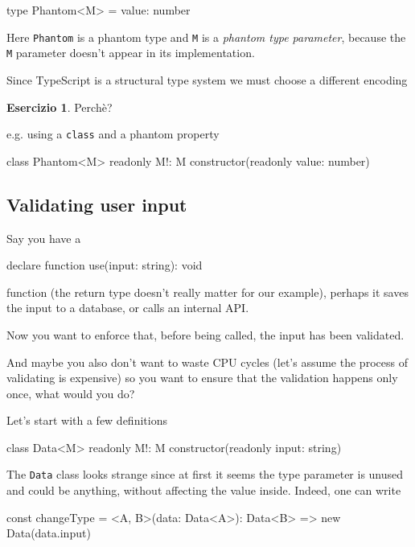 \documentclass[12pt]{article}
\theoremstyle{definition}
\newtheorem{exercise}{Esercizio}[subsection]
\newenvironment{code}
  {\vspace{0.5cm} \VerbatimEnvironment\begin{typescriptcode}}
  {\end{typescriptcode} \vspace{0.2cm}}
\begin{document}
\begin{code}
type Phantom<M> = { value: number }
\end{code}

Here \texttt{Phantom} is a phantom type and \texttt{M} is a \emph{phantom type parameter},
because the \texttt{M} parameter doesn't appear in its implementation.

Since TypeScript is a structural type system we must choose a different encoding

\begin{exercise}
Perchè?
\end{exercise}

e.g. using a \texttt{class} and a phantom property

\begin{code}
class Phantom<M> {
  readonly M!: M
  constructor(readonly value: number) {}
}
\end{code}

\subsection{Validating user input}

Say you have a

\begin{code}
declare function use(input: string): void
\end{code}

function (the return type doesn't really matter for our example),
perhaps it saves the input to a database, or calls an internal API.

Now you want to enforce that, before being called, the input has been validated.

And maybe you also don't want to waste CPU cycles (let's assume the process of validating is expensive)
so you want to ensure that the validation happens only once, what would you do?

Let's start with a few definitions

\begin{code}
class Data<M> {
  readonly M!: M
  constructor(readonly input: string) {}
}
\end{code}

The \texttt{Data} class looks strange since at first it seems the type parameter is unused and could be anything,
without affecting the value inside. Indeed, one can write

\begin{code}
const changeType = <A, B>(data: Data<A>): Data<B> =>
  new Data(data.input)
\end{code}
\end{document}
